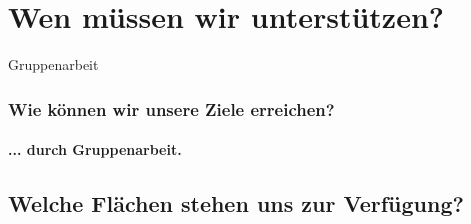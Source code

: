\documentclass[aspectratio=43]{beamer}
\begin{document}
\section{Wen müssen wir unterstützen?}

\begin{frame}{Gruppenarbeit}
	\frametitle{Wie können wir unsere Ziele erreichen?} 
	\framesubtitle{... durch Gruppenarbeit.}
\end{frame}
\subsection[Flächen]{Welche Flächen stehen uns zur Verfügung?}
\end{document}
